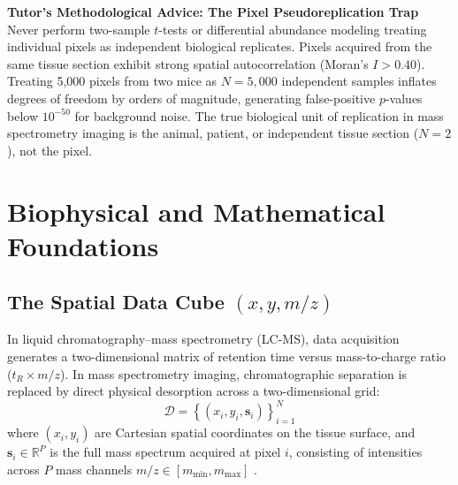 \documentclass[11pt,twoside,openright]{book}
\begin{document}
\FloatBarrier

\begin{notebox}
\textbf{Tutor's Methodological Advice: The Pixel Pseudoreplication Trap}\\
Never perform two-sample $t$-tests or differential abundance modeling treating individual pixels as independent biological replicates. Pixels acquired from the same tissue section exhibit strong spatial autocorrelation (Moran's $I > 0.40$). Treating 5,000 pixels from two mice as $N = 5{,}000$ independent samples inflates degrees of freedom by orders of magnitude, generating false-positive $p$-values below $10^{-50}$ for background noise. The true biological unit of replication in mass spectrometry imaging is the animal, patient, or independent tissue section ($N = 2$), not the pixel.
\end{notebox}

\section{Biophysical and Mathematical Foundations}

\subsection{The Spatial Data Cube \texorpdfstring{$(x, y, m/z)$}{(x, y, m/z)}}

In liquid chromatography--mass spectrometry (LC-MS), data acquisition generates a two-dimensional matrix of retention time versus mass-to-charge ratio ($t_R \times m/z$). In mass spectrometry imaging, chromatographic separation is replaced by direct physical desorption across a two-dimensional grid:
\begin{equation}
\mathcal{D} = \left\{ \left( x_i, y_i, \mathbf{s}_i \right) \right\}_{i=1}^{N}
\label{eq:msi_datacube}
\end{equation}
where $(x_i, y_i)$ are Cartesian spatial coordinates on the tissue surface, and $\mathbf{s}_i \in \mathbb{R}^P$ is the full mass spectrum acquired at pixel $i$, consisting of intensities across $P$ mass channels $m/z \in [m_{\min}, m_{\max}]$ \cite{bemis2015cardinal, norris2013mass}.
\end{document}
